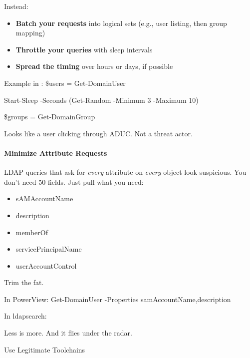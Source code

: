 Instead:

\begin{itemize}
    \item \textbf{Batch your requests} into logical sets (e.g., user listing, then group mapping)

    \item \textbf{Throttle your queries} with sleep intervals

    \item \textbf{Spread the timing} over hours or days, if possible

\end{itemize}
Example in  :
\$users = Get-DomainUser

Start-Sleep -Seconds (Get-Random -Minimum 3 -Maximum 10)

\$groups = Get-DomainGroup

Looks like a user clicking through ADUC. Not a threat actor.

\paragraph{\textbf{   Minimize Attribute Requests}}

LDAP queries that ask for \textit{every} attribute on \textit{every} object look suspicious. You don’t need 50 fields. Just pull what you need:

\begin{itemize}
    \item sAMAccountName

    \item description

    \item memberOf

    \item servicePrincipalName

    \item userAccountControl

\end{itemize}
Trim the fat.

In PowerView:
Get-DomainUser -Properties samAccountName,description

In ldapsearch:


Less is more. And it flies under the radar.

Use Legitimate Toolchains

